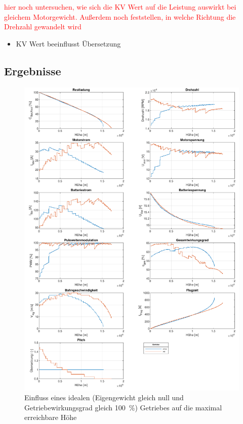 \textcolor{red}{hier noch untersuchen, wie sich die KV Wert auf die Leistung auswirkt bei gleichem Motorgewicht. Außerdem noch feststellen, in welche Richtung die Drehzahl gewandelt wird}

\begin{itemize}
	\item KV Wert beeinflusst Übersetzung
\end{itemize}

\subsection{Ergebnisse}
\begin{figure}[H]
\centering
	\includegraphics[scale=0.7]{Diagramme/Getriebe.pdf}
	\caption{Einfluss eines idealen (Eigengewicht gleich null und Getriebewirkungsgrad gleich \SI{100}{\%}) Getriebes auf die maximal erreichbare Höhe}
	\label{abb:getriebe}
\end{figure}

